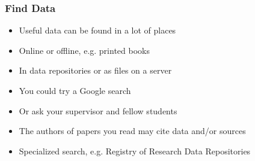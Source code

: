 \documentclass{beamer}
\begin{document}
\begin{frame}
  \frametitle{Find Data}
  
  \begin{itemize}
  \item Useful data can be found in a lot of places
  \item Online or offline, e.g. printed books
  \item In data repositories or as files on a server
  \item You could try a Google search
  \item Or ask your supervisor and fellow students
  \item The authors of papers you read may cite data and/or sources
  \item Specialized search, e.g. Registry of Research Data Repositories
  \end{itemize}
\end{frame}

{
	\begin{frame}[plain]
	\end{frame}
}
\end{document}
